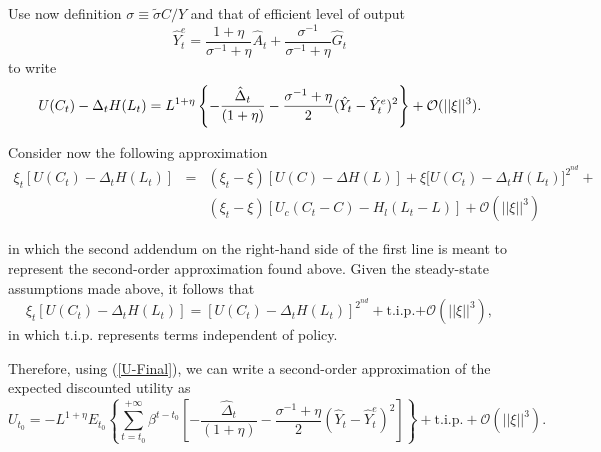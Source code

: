 \documentclass[11pt,aspectratio=169]{beamer}
\begin{document}
\begin{frame}\small
Use now definition $\sigma \equiv \tilde{\sigma}C/Y$ and that of efficient
level of output 
\begin{equation*}
\hat{Y}_{t}^{e}=\frac{1+\eta }{\sigma ^{-1}+\eta }\hat{A}_{t}+\frac{\sigma
^{-1}}{\sigma ^{-1}+\eta }\hat{G}_{t}
\end{equation*}
to write%
\begin{equation}
U(C_{t})-\Delta _{t}H(L_{t})=L^{1+\eta }\left\{ -\frac{\hat{\Delta}_{t}}{%
(1+\eta )}-\frac{\sigma ^{-1}+\eta }{2}(\hat{Y}_{t}-\hat{Y}%
_{t}^{e})^{2}\right\} +\mathcal{O}(||\xi ||^{3}).  \label{U-Final}
\end{equation}

Consider now the following approximation 
\begin{eqnarray*}
\xi _{t}[U(C_{t})-\Delta _{t}H(L_{t})] &=&(\xi _{t}-\xi )[U(C)-\Delta
H(L)]+\xi \lbrack U(C_{t})-\Delta _{t}H(L_{t})]^{2^{nd}}+ \\
&&(\xi _{t}-\xi )[U_{c}(C_{t}-C)-H_{l}(L_{t}-L)]+\mathcal{O}(||\xi ||^{3})
\end{eqnarray*}
\end{frame}
\begin{frame}\small
in which the second addendum on the right-hand side of the first line is
meant to represent the second-order approximation found above. Given the
steady-state assumptions made above, it follows that%
\begin{equation*}
\xi _{t}[U(C_{t})-\Delta _{t}H(L_{t})]=[U(C_{t})-\Delta
_{t}H(L_{t})]^{2^{nd}}+\text{t.i.p.+}\mathcal{O}(||\xi ||^{3}),
\end{equation*}%
in which t.i.p. represents terms independent of policy.

Therefore, using (\ref{U-Final}), we can write a second-order approximation
of the expected discounted utility as%
\begin{equation}
U_{t_{0}}=-L^{1+\eta }E_{t_{0}}\left\{ \sum_{t=t_{0}}^{+\infty }\beta
^{t-t_{0}}\left[ -\frac{\hat{\Delta}_{t}}{(1+\eta )}-\frac{\sigma ^{-1}+\eta 
}{2}(\hat{Y}_{t}-\hat{Y}_{t}^{e})^{2}\right] \right\} +\text{t.i.p.}+%
\mathcal{O}(||\xi ||^{3}).  \label{Uapprox11}
\end{equation}%
\end{frame}
\end{document}
